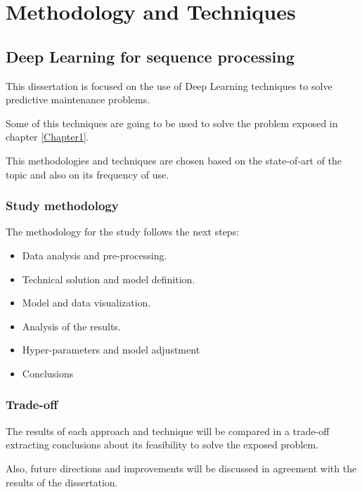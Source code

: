 
\chapter{Methodology and Techniques} %

\label{Chapter2}


\section{Deep Learning for sequence processing}

This dissertation is focused on the use of Deep Learning techniques to solve predictive maintenance problems.

Some of this techniques are going to be used to solve the problem exposed in chapter \ref{Chapter1}.

This methodologies and techniques are chosen based on the state-of-art of the topic and also on its frequency of use.


\subsection{Study methodology}

The methodology for the study follows the next steps:

\begin{itemize}
    \item Data analysis and pre-processing.
    \item Technical solution and model definition.
    \item Model and data visualization.
    \item Analysis of the results.
    \item Hyper-parameters and model adjustment
    \item Conclusions
\end{itemize}


\subsection{Trade-off}

The results of each approach and technique will be compared in a trade-off extracting conclusions about its feasibility to solve the exposed problem.

Also, future directions and improvements will be discussed in agreement with the results of the dissertation.